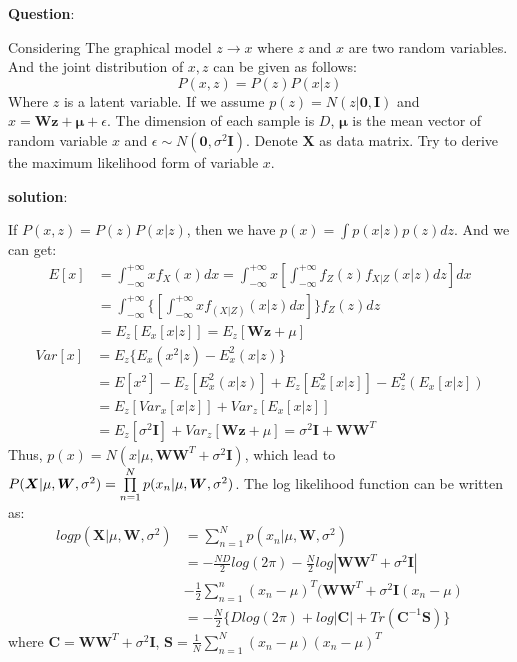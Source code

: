 \documentclass[letterpaper,a5paper, 12 pt]{article}
\begin{document}
\noindent \textbf{Question}:

\noindent Considering The graphical model $z \rightarrow x$ where $z$ and $x$ are two random variables. And the joint distribution of $x,z$ can be given as follows:$$P(x,z) = P(z)P(x|z)$$Where $z$ is a latent variable. If we assume $p(z) = N(z|\boldsymbol{0},\boldsymbol{I})$ and $x = \boldsymbol{Wz} + \boldsymbol{\mu} + \epsilon.$ The dimension of each sample is $D$, $\boldsymbol{\mu}$ is the mean vector of random variable $x$ and $\epsilon\sim N(\boldsymbol{0},\sigma^{2}\boldsymbol{I})$. Denote $\boldsymbol{X}$ as data matrix. Try to derive the maximum likelihood form of variable $x$.

\noindent \textbf{solution}:

If $P(x,z) = P(z)P(x|z)$, then we have $p(x) = \int{p(x|z)p(z)dz}$. And we can get:
\begin{align*}
E[x] &= \int_{-\infty}^{+\infty}xf_X(x)dx = \int_{-\infty}^{+\infty}x[\int_{-\infty}^{+\infty}f_Z(z)f_{X|Z}(x|z)dz]dx\\
&= \int_{-\infty}^{+\infty}\{[\int_{-\infty}^{+\infty}xf_{(X|Z)}(x|z)dx]\}f_Z(z)dz \\&= E_{z}[E_{x}[x|z]]= E_{z}[\boldsymbol{Wz} + \mu]
\end{align*}
\begin{align*}
Var[x] &= E_z\{E_x(x^2|z) -E_x^2(x|z)\}\\&=E[x^2]-E_z[E_x^2(x|z)]+E_z[E_x^2[x|z]]-E_z^2(E_x[x|z])\\
&= E_{z}[Var_{x}[x|z]] + Var_{z}[E_{x}[x|z]]\\
       &= E_{z}[\sigma^{2}\boldsymbol{I}] + Var_{z}[\boldsymbol{Wz} + \mu] 
       = \sigma^{2}\boldsymbol{I} + \boldsymbol{WW}^{T}
\end{align*}
Thus, $p(x) = N(x|\mu,\boldsymbol{WW}^T + \sigma^2\boldsymbol{I})$, which lead to $P(\boldsymbol{X}|\mu,\boldsymbol{W},\sigma^2)=
\prod\limits_{n=1}^{N}p(x_n|\\\mu,\boldsymbol{W},\sigma^2)$. The log likelihood function can be written as:
\begin{align*}
logp(\boldsymbol{X}|\mu,\boldsymbol{W},\sigma^2)
&= \sum\limits_{n=1}^{N}p(x_{n}|\mu,\boldsymbol{W},\sigma^2)\\
&= -\frac{ND}{2}log(2\pi) - \frac{N}{2}log|\boldsymbol{WW}^T + \sigma^2\boldsymbol{I}|\\
&- \frac{1}{2}\sum\limits_{n=1}^{n}(x_n - \mu)^T(\boldsymbol{WW}^T + \sigma^2\boldsymbol{I}(x_n - \mu)\\
&= -\frac{N}{2}\{Dlog(2\pi) + log|\boldsymbol{C}| + Tr(\boldsymbol{C}^{-1}\boldsymbol{S})\}
\end{align*}
where $\boldsymbol{C} = \boldsymbol{WW}^T + \sigma^2\boldsymbol{I}$, $\boldsymbol{S} = \frac{1}{N}\sum\limits_{n=1}^{N}(x_n - \mu)(x_n - \mu)^T$
\end{document}
